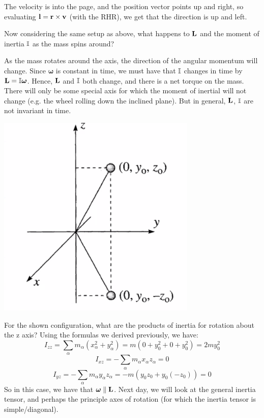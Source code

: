 \begin{s}
The velocity is into the page, and the position vector points up and right, so evaluating $\mathbf{l} = \mathbf{r}\times\mathbf{v}$ (with the RHR), we get that the direction is up and left.
\end{s}
Now considering the same setup as above, what happens to $\mathbf{L}$ and the moment of inertia $\mathbb{I}$ as the mass spins around?
\begin{s}
As the mass rotates around the axis, the direction of the angular momentum will change. Since $\bm{\omega}$ is constant in time, we must have that $\mathbb{I}$ changes in time by $\mathbf{L} = \mathbb{I}\bm{\omega}$. Hence, $\mathbf{L}$ and $\mathbb{I}$ both change, and there is a net torque on the mass. There will only be some special axis for which the moment of inertial will not change (e.g. the wheel rolling down the inclined plane). But in general, $\mathbf{L}$, $\mathbb{I}$ are not invariant in time. 
\end{s}
\begin{center}
    \includegraphics[scale=0.5]{Lecture-17/l17-img7.png}
\end{center}
For the shown configuration, what are the products of inertia for rotation about the z axis? Using the formulas we derived previously, we have:
\[I_{zz} = \sum_\alpha m_\alpha(x_\alpha^2 + y_\alpha^2) = m(0 + y_0^2 + 0 + y_0^2) = 2my_0^2\]
\[I_{xz} = -\sum_\alpha m_\alpha x_\alpha z_\alpha = 0\]
\[I_{yz} = -\sum_{\alpha}m_\alpha y_\alpha z_\alpha = -m(y_0z_0 + y_0(-z_0)) = 0\]
So in this case, we have that $\bm{\omega} \parallel \mathbf{L}$. Next day, we will look at the general inertia tensor, and perhaps the principle axes of rotation (for which the inertia tensor is simple/diagonal).
